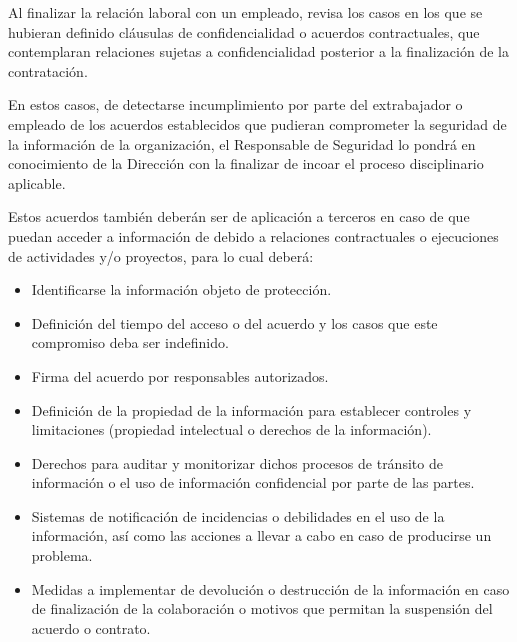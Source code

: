 \begin{enumerate}[label=\alph*)]
Al finalizar la relación laboral con un empleado, \Beneficiario{} revisa los casos en los que se hubieran definido cláusulas de confidencialidad o acuerdos contractuales, que contemplaran relaciones sujetas a confidencialidad posterior a la finalización de la contratación.

En estos casos, de detectarse incumplimiento por parte del extrabajador o empleado de los acuerdos establecidos que pudieran comprometer la seguridad de la información de la organización, el Responsable de Seguridad lo pondrá en conocimiento de la Dirección con la finalizar de incoar el proceso disciplinario aplicable.

Estos acuerdos también deberán ser de aplicación a terceros en caso de que puedan acceder a información de \Beneficiario{} debido a relaciones contractuales o ejecuciones de actividades y/o proyectos, para lo cual deberá:

\begin{itemize}
    \item Identificarse la información objeto de protección.
    \item Definición del tiempo del acceso o del acuerdo y los casos que este compromiso deba ser indefinido.
    \item Firma del acuerdo por responsables autorizados.
    \item Definición de la propiedad de la información para establecer controles y limitaciones (propiedad intelectual o derechos de la información).
    \item Derechos para auditar y monitorizar dichos procesos de tránsito de información o el uso de información confidencial por parte de las partes.
    \item Sistemas de notificación de incidencias o debilidades en el uso de la información, así como las acciones a llevar a cabo en caso de producirse un problema.
    \item Medidas a implementar de devolución o destrucción de la información en caso de finalización de la colaboración o motivos que permitan la suspensión del acuerdo o contrato.
\end{itemize}

\end{enumerate}